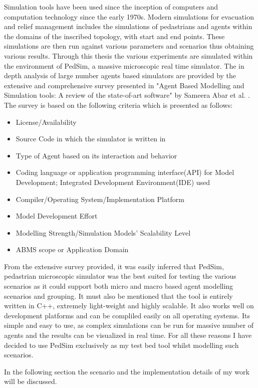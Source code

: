Simulation tools have been used since the inception of computers and computation technology since the early 1970s. Modern simulations for evacuation and relief management includes the simulations of pedastrians and agents within the domains of the inscribed topology, with start and end points. These simulations are then run against various parameters and scenarios thus obtaining various results. Through this thesis the various experiments are simulated within the environment of PedSim, a massive microscopic real time simulator. The in depth analysis of large number agents based simulators are provided by the extensive and comprehensive survey presented in "Agent Based Modelling and Simulation tools: A review of the state-of-art software" by Sameera Abar et al. \cite{ref22}. The survey is based on the following criteria which is presented as follows:

\begin{itemize}
  \item License/Availability
  \item Source Code in which the simulator is written in
  \item Type of Agent based on its interaction and behavior
  \item Coding language or application programming interface(API) for Model Development; Integrated Development Environment(IDE) used
  \item Compiler/Operating System/Implementation Platform
  \item Model Development Effort
  \item Modelling Strength/Simulation Models' Scalability Level
  \item ABMS scope or Application Domain
\end{itemize} 

From the extensive survey provided, it was easily inferred that PedSim, pedastrian microscopic simulator was the best suited for testing the various scenarios as it could support both micro and macro based agent modelling scenarios and grouping. It must also be mentioned that the tool is entirely written in C++, extremely light-weight and highly scalable. It also works well on development platforms and can be compliled easily on all operating systems. Its simple and easy to use, as complex simulations can be run for massive number of agents and the results can be visualized in real time. For all these reasons I have decided to use PedSim exclusively as my test bed tool whilst modelling such scenarios. 

In the following section the scenario and the implementation details of my work will be discussed.